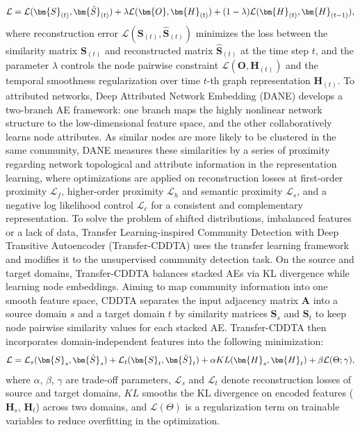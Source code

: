 \begin{equation}
\small
\mathcal{L} = \mathcal{L}(\bm{S}_{(t)}, \bm{\hat{S}}_{(t)})+ \lambda \mathcal{L}(\bm{O}, \bm{H}_{(t)}) + (1-\lambda) \mathcal{L}(\bm{H}_{(t)}, \bm{H}_{(t-1)}),
\end{equation}
where reconstruction error $\mathcal{L}(\bm{S}_{(t)}, \bm{\hat{S}}_{(t)})$ minimizes the loss between the similarity matrix $\bm{S}_{(t)}$ and reconstructed matrix $\bm{\hat{S}}_{(t)}$ at the time step $t$, and the parameter $\lambda$ controls the node pairwise constraint $\mathcal{L}(\bm{O},\bm{H}_{(t)})$ and the temporal smoothness regularization over time $t$-th graph representation $\bm{H}_{(t)}$.
To attributed networks, Deep Attributed Network Embedding (DANE)  develops a two-branch AE framework: one branch maps the highly nonlinear network structure to the low-dimensional feature space, and the other collaboratively learns node attributes. As similar nodes are more likely to be clustered in the same community, DANE measures these similarities by a series of proximity regarding network topological and attribute information in the representation learning, where optimizations are applied on reconstruction losses at first-order proximity $\mathcal{L}_f$, higher-order proximity $\mathcal{L}_h$ and semantic proximity $\mathcal{L}_s$, and a negative log likelihood control $\mathcal{L}_c$ for a consistent and complementary representation.
To solve the problem of shifted distributions, imbalanced features or a lack of data, Transfer Learning-inspired Community Detection with Deep Transitive Autoencoder (Transfer-CDDTA)  uses the transfer learning framework and modifies it to the unsupervised community detection task. On the source and target domains, Transfer-CDDTA balances stacked AEs via KL divergence while learning node embeddings. Aiming to map community information into one smooth feature space, CDDTA separates the input adjacency matrix $\bm{A}$ into a source domain $s$ and a target domain $t$ by similarity matrices $\bm{S}_s$ and $\bm{S}_t$ to keep node pairwise similarity values for each stacked AE. Transfer-CDDTA then incorporates domain-independent features into the following minimization: 
\begin{equation}
\small
\mathcal{L} = \mathcal{L}_s(\bm{S}_s, \bm{\hat{S}}_s) + \mathcal{L}_t(\bm{S}_t, \bm{\hat{S}}_t) + \alpha KL(\bm{H}_s,\bm{H}_t)+\beta\mathcal{L}(\Theta; \gamma),
\end{equation}
where $\alpha$, $\beta$, $\gamma$ are trade-off parameters, $\mathcal{L}_s$ and $\mathcal{L}_t$ denote reconstruction losses of source and target domains, $KL$ smooths the KL divergence on encoded features ($\bm{H}_s$, $\bm{H}_t$) across two domains, and $\mathcal{L}(\Theta)$ is a regularization term on trainable variables to reduce overfitting in the optimization. 
